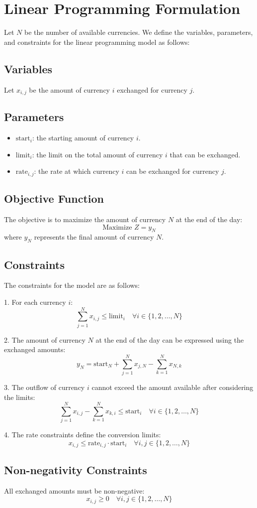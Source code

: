 \documentclass{article}
\begin{document}
\section*{Linear Programming Formulation}

Let \( N \) be the number of available currencies. We define the variables, parameters, and constraints for the linear programming model as follows:

\subsection*{Variables}
Let \( x_{i,j} \) be the amount of currency \( i \) exchanged for currency \( j \).

\subsection*{Parameters}
\begin{itemize}
    \item \( \text{start}_i \): the starting amount of currency \( i \).
    \item \( \text{limit}_i \): the limit on the total amount of currency \( i \) that can be exchanged.
    \item \( \text{rate}_{i,j} \): the rate at which currency \( i \) can be exchanged for currency \( j \).
\end{itemize}

\subsection*{Objective Function}
The objective is to maximize the amount of currency \( N \) at the end of the day:
\[
\text{Maximize } Z = y_N
\]
where \( y_N \) represents the final amount of currency \( N \).

\subsection*{Constraints}
The constraints for the model are as follows:

1. For each currency \( i \):
\[
\sum_{j=1}^{N} x_{i,j} \leq \text{limit}_i \quad \forall i \in \{1, 2, \ldots, N\}
\]

2. The amount of currency \( N \) at the end of the day can be expressed using the exchanged amounts:
\[
y_N = \text{start}_N + \sum_{j=1}^{N} x_{j,N} - \sum_{k=1}^{N} x_{N,k}
\]

3. The outflow of currency \( i \) cannot exceed the amount available after considering the limits:
\[
\sum_{j=1}^{N} x_{i,j} - \sum_{k=1}^{N} x_{k,i} \leq \text{start}_i \quad \forall i \in \{1, 2, \ldots, N\}
\]

4. The rate constraints define the conversion limits:
\[
x_{i,j} \leq \text{rate}_{i,j} \cdot \text{start}_i \quad \forall i,j \in \{1, 2, \ldots, N\}
\]

\subsection*{Non-negativity Constraints}
All exchanged amounts must be non-negative:
\[
x_{i,j} \geq 0 \quad \forall i,j \in \{1, 2, \ldots, N\}
\]
\end{document}
